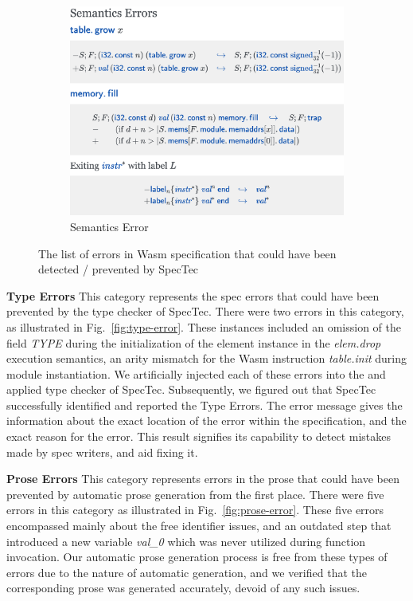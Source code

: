 \begin{figure}
\begin{subfigure}[b]{0.49\textwidth}
    \includegraphics[width=\textwidth]{../img/semantics-error}
    \caption{Semantics Error}
    \label{fig:semantics-error}
  \end{subfigure}
  \caption{The list of errors in Wasm specification that could have been detected / prevented by SpecTec}
\end{figure}

\textbf{Type Errors}
This category represents the spec errors that could have been prevented by the
type checker of SpecTec. There were two errors in this category, as illustrated
in Fig.~\ref{fig:type-error}. These instances included an omission of the field
\textit{TYPE} during the initialization of the element instance in the
\textit{elem.drop} execution semantics, an arity mismatch for the Wasm
instruction \textit{table.init} during module instantiation.  We artificially injected each of these
errors into the \specdsl and applied type checker of SpecTec.  Subsequently, we
figured out that SpecTec successfully identified and reported the Type Errors.
The error message gives the information about the exact location of the error
within the specification, and the exact reason for the error.  This result
signifies its capability to detect mistakes made by spec writers, and aid
fixing it.

\textbf{Prose Errors}
This category represents errors in the prose that could have been prevented by
automatic prose generation from the first place. There were five errors in this
category as illustrated in Fig.~\ref{fig:prose-error}. These five errors
encompassed mainly about the free identifier issues, and an outdated step that
introduced a new variable \textit{val\_0} which was never utilized during
function invocation. Our automatic prose generation process
is free from these types of errors due to the nature of automatic generation,
and we verified that the corresponding prose was generated accurately, devoid
of any such issues.

